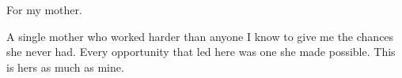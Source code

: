 \begin{dedication}
For my mother.

A single mother who worked harder than anyone I know to give me the chances she
never had. Every opportunity that led here was one she made possible. This is
hers as much as mine.
\end{dedication}
